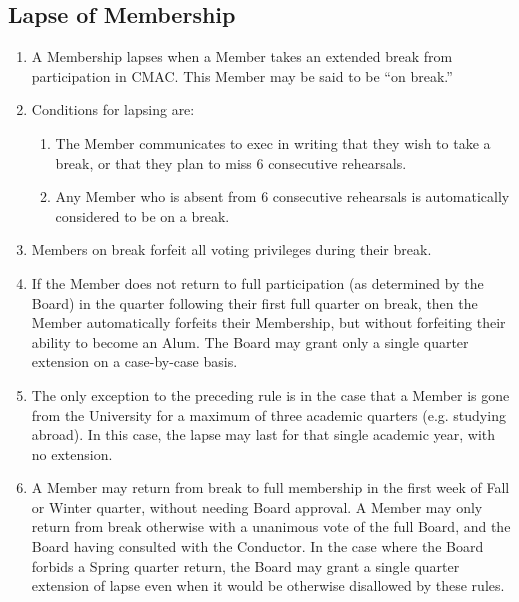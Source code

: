 \documentclass{article}
\begin{document}
\subsection{Lapse of Membership}
\begin{enumerate}
\item A Membership lapses when a Member takes an extended break from
  participation in CMAC. This Member may be said to be ``on break.''
\item Conditions for lapsing are:
  \begin{enumerate}
  \item The Member communicates to exec in writing that they wish to take a
    break, or that they plan to miss 6 consecutive rehearsals.
  \item Any Member who is absent from 6 consecutive rehearsals is automatically
    considered to be on a break.
  \end{enumerate}
\item Members on break forfeit all voting privileges during their break.
\item If the Member does not return to full participation (as determined by the
  Board) in the quarter following their first full quarter on break, then the
  Member automatically forfeits their Membership, but without forfeiting their
  ability to become an Alum. The Board may grant only a single quarter extension
  on a case-by-case basis.
\item The only exception to the preceding rule is in the case that a Member is
  gone from the University for a maximum of three academic quarters
  (e.g. studying abroad). In this case, the lapse may last for that single
  academic year, with no extension.
\item A Member may return from break to full membership in the first week of
  Fall or Winter quarter, without needing Board approval. A Member may only
  return from break otherwise with a unanimous vote of the full Board, and the
  Board having consulted with the Conductor. In the case where the Board forbids
  a Spring quarter return, the Board may grant a single quarter extension of
  lapse even when it would be otherwise disallowed by these rules.
\end{enumerate}

\end{document}
